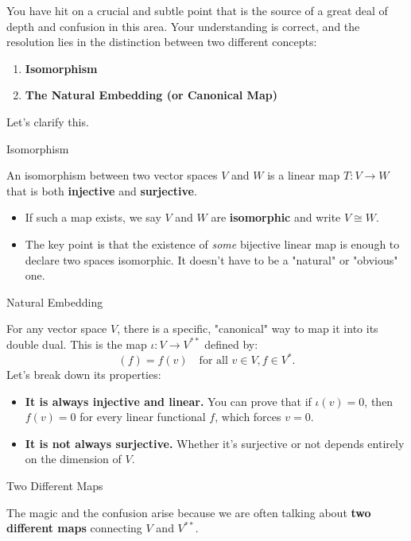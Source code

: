 \documentclass[aps,preprint]{revtex4}
\newenvironment{answer}
  {\begin{tcolorbox}[colback=green!5!white,colframe=green!75!black,title=Answer]}
  {\end{tcolorbox}}
\begin{document}
\begin{answer}
You have hit on a crucial and subtle point that is the source of a great
deal of depth and confusion in this area. Your understanding is correct, and
the resolution lies in the distinction between two different concepts:

\begin{enumerate}
\item \textbf{Isomorphism}

\item \textbf{The Natural Embedding (or Canonical Map)}
\end{enumerate}

Let's clarify this.

Isomorphism

An isomorphism between two vector spaces $V$ and $W$ is a linear map $T: V
\to W$ that is both \textbf{injective} and \textbf{surjective}.

\begin{itemize}
\item If such a map exists, we say $V$ and $W$ are \textbf{isomorphic} and
write $V \cong W$.

\item The key point is that the existence of \textit{some} bijective linear
map is enough to declare two spaces isomorphic. It doesn't have to be a
"natural" or "obvious" one.
\end{itemize}

Natural Embedding

For any vector space $V$, there is a specific, "canonical" way to map it
into its double dual. This is the map $\iota: V \to V^{**}$ defined by: 
\begin{equation*}
[\iota(v)](f) = f(v) \quad \text{for all } v \in V, f \in V^*.
\end{equation*}
Let's break down its properties:

\begin{itemize}
\item \textbf{It is always injective and linear.} You can prove that if $%
\iota(v) = 0$, then $f(v) = 0$ for every linear functional $f$, which forces 
$v = 0$.

\item \textbf{It is not always surjective.} Whether it's surjective or not
depends entirely on the dimension of $V$.
\end{itemize}

Two Different Maps

The magic and the confusion arise because we are often talking about \textbf{%
two different maps} connecting $V$ and $V^{**}$.


\end{answer}
\end{document}
